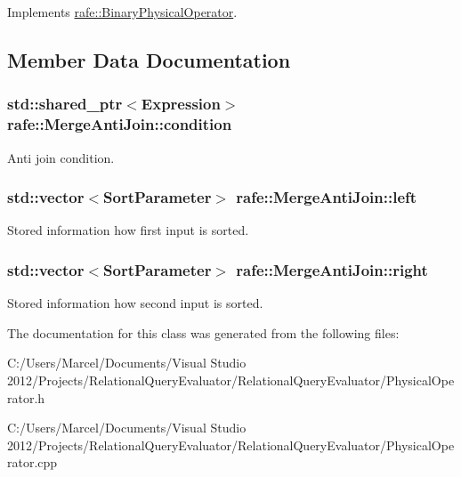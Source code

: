 Implements \hyperlink{classrafe_1_1_binary_physical_operator_a58ce0a14b970b2c932254419877a2e0e}{rafe\+::\+Binary\+Physical\+Operator}.



\subsection{Member Data Documentation}
\hypertarget{classrafe_1_1_merge_anti_join_a25262bcb30b68e719e540c6237f56228}{
\subsubsection[{condition}]{\setlength{\rightskip}{0pt plus 5cm}std\+::shared\+\_\+ptr$<${\bf Expression}$>$ rafe\+::\+Merge\+Anti\+Join\+::condition}}\label{classrafe_1_1_merge_anti_join_a25262bcb30b68e719e540c6237f56228}
Anti join condition. \hypertarget{classrafe_1_1_merge_anti_join_adde369c7d6dcdeb5530b40999af4c4c4}{
\subsubsection[{left}]{\setlength{\rightskip}{0pt plus 5cm}std\+::vector$<${\bf Sort\+Parameter}$>$ rafe\+::\+Merge\+Anti\+Join\+::left}}\label{classrafe_1_1_merge_anti_join_adde369c7d6dcdeb5530b40999af4c4c4}
Stored information how first input is sorted. \hypertarget{classrafe_1_1_merge_anti_join_a278393533a0b0a6f3c38ba6810abf221}{
\subsubsection[{right}]{\setlength{\rightskip}{0pt plus 5cm}std\+::vector$<${\bf Sort\+Parameter}$>$ rafe\+::\+Merge\+Anti\+Join\+::right}}\label{classrafe_1_1_merge_anti_join_a278393533a0b0a6f3c38ba6810abf221}
Stored information how second input is sorted. 

The documentation for this class was generated from the following files\+:\begin{DoxyCompactItemize}
\item 
C\+:/\+Users/\+Marcel/\+Documents/\+Visual Studio 2012/\+Projects/\+Relational\+Query\+Evaluator/\+Relational\+Query\+Evaluator/Physical\+Operator.\+h\item 
C\+:/\+Users/\+Marcel/\+Documents/\+Visual Studio 2012/\+Projects/\+Relational\+Query\+Evaluator/\+Relational\+Query\+Evaluator/Physical\+Operator.\+cpp\end{DoxyCompactItemize}
